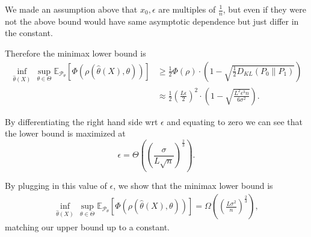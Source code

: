 \documentclass{article}
\newcommand{\Pd}{\mathcal{P}}
\newcommand{\Ev}{\mathbb{E}}
\begin{document}
	We made an assumption above that $x_0,\epsilon$ are multiples of $\frac{1}{n}$, but even if they were not the above bound would have same asymptotic dependence but just differ in the constant.
	
	Therefore the minimax lower bound is 
	\begin{align*}
	\inf_{\hat\theta(X)} \, \sup_{\theta \in \Theta} \Ev_{\Pd_\theta} \left[ \Phi(\rho(\hat\theta(X),\theta))\right]
	& \geq \frac{1}{2}\Phi(\rho) \cdot \left(1 - \sqrt{\frac{1}{2}D_{KL}(P_0\|P_1)}\right) \\ 
	& \approx \frac{1}{2}\left(\frac{L\epsilon}{2}\right)^2 \cdot \left(1 - \sqrt{\frac{L^2\epsilon^3 n}{6\sigma^2}}\right).
	\end{align*}
	
	By differentiating the right hand side wrt $\epsilon$ and equating to zero we can see that the lower bound is maximized at 
	\[
	\epsilon = \Theta\left( \left(\frac{\sigma}{L\sqrt{n}}\right)^{\frac{2}{3}} \right).
	\]
	
	By plugging in this value of $\epsilon$, we show that the minimax lower bound is
	\begin{align*}
	\inf_{\hat\theta(X)} \, \sup_{\theta \in \Theta} \Ev_{\Pd_\theta} \left[ \Phi(\rho(\hat\theta(X),\theta))\right] = \Omega\left( \left(\frac{L \sigma^2}{n}\right)^{\frac{2}{3}} \right),
	\end{align*}
	matching our upper bound up to a constant.
\end{document}
